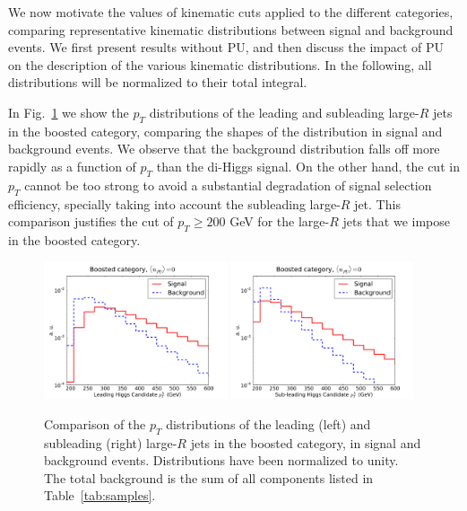 We now motivate the values of
kinematic cuts applied to the different categories, 
comparing representative kinematic distributions between
signal and background events.
%
We first present results without PU, and then
discuss
the impact of PU
on the description of the various kinematic
distributions.
%
In the following, all
distributions will be normalized to their total integral.


In Fig.~\ref{fig:cutplots1} we show
the $p_T$ distributions
of the
  leading and subleading large-$R$ jets in the boosted category, comparing
  the shapes of the distribution in signal and background events.
  We observe that the background distribution
falls off more rapidly as a function of $p_T$ than the di-Higgs signal.
  On the other hand, the cut in $p_T$ cannot be too strong to avoid
  a substantial degradation of signal selection efficiency,
  specially taking into account the subleading large-$R$ jet.
  This comparison justifies the cut of $p_T \ge 200$ GeV
  for the large-$R$ jets that we impose in the boosted category.
  

\begin{figure}[t]
\begin{center}
 \includegraphics[width=0.48\textwidth]{plots/pt_H0_bst_C1d_noPU.pdf}
 \includegraphics[width=0.48\textwidth]{plots/pt_H1_bst_C1d_noPU.pdf}
\caption{\small  Comparison of the $p_T$ distributions of the
  leading (left) and
  subleading (right) large-$R$ jets in the boosted category,
  in signal and background events.
  Distributions have been normalized to unity.
  The total background is the sum of all components
  listed in Table~\ref{tab:samples}.
}
\label{fig:cutplots1}
\end{center}
\end{figure}


